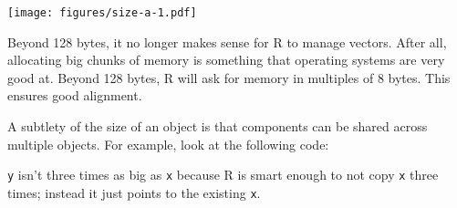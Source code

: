 \begin{Shaded}
\begin{Highlighting}[]
\NormalTok{(}\NormalTok{:}\StringTok{ }\NormalTok{, } \NormalTok{, }
   \NormalTok{, } \NormalTok{)}
\NormalTok{(} \NormalTok{, } \NormalTok{)}
\NormalTok{(} \NormalTok{(}\NormalTok{, }\NormalTok{, }\NormalTok{, }\NormalTok{, }\NormalTok{, }\NormalTok{), } \NormalTok{)}
\NormalTok{(} \NormalTok{, } \NormalTok{, } \NormalTok{, } \NormalTok{)}
\StringTok{ }\NormalTok{, } \NormalTok{)}
\end{Highlighting}
\end{Shaded}

\texttt{[image: figures/size-a-1.pdf]}

Beyond 128 bytes, it no longer makes sense for R to manage vectors.
After all, allocating big chunks of memory is something that operating
systems are very good at. Beyond 128 bytes, R will ask for memory in
multiples of 8 bytes. This ensures good alignment.

A subtlety of the size of an object is that components can be shared
across multiple objects. For example, look at the following code:

\begin{Shaded}
\begin{Highlighting}[]
\StringTok{ }\NormalTok{:}

\StringTok{ }
\end{Highlighting}
\end{Shaded}

\texttt{y} isn't three times as big as \texttt{x} because R is smart
enough to not copy \texttt{x} three times; instead it just points to the
existing \texttt{x}.

